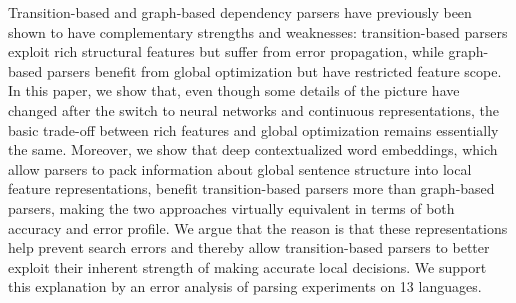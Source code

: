 Transition-based and graph-based dependency parsers have previously been shown to have complementary strengths and weaknesses: transition-based parsers exploit rich structural features but suffer from error propagation, while graph-based parsers benefit from global optimization but have restricted feature scope. In this paper, we show that, even though some details of the picture have changed after the switch to neural networks and continuous representations, the basic trade-off between rich features and global optimization remains essentially the same. Moreover, we show that deep contextualized word embeddings, which allow parsers to pack information about global sentence structure into local feature representations, benefit transition-based parsers more than graph-based parsers, making the two approaches virtually equivalent in terms of both accuracy and error profile. We argue that the reason is that these representations help prevent search errors and thereby allow transition-based parsers to better exploit their inherent strength of making
accurate local decisions. We support this explanation by an error analysis of parsing experiments on 13 languages.